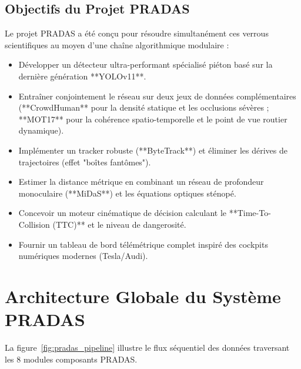 \documentclass[11pt,a4paper]{article}
\begin{document}
\subsection{Objectifs du Projet PRADAS}
Le projet PRADAS a été conçu pour résoudre simultanément ces verrous scientifiques au moyen d'une chaîne algorithmique modulaire :
\begin{itemize}
    \item Développer un détecteur ultra-performant spécialisé piéton basé sur la dernière génération **YOLOv11**.
    \item Entraîner conjointement le réseau sur deux jeux de données complémentaires (**CrowdHuman** pour la densité statique et les occlusions sévères ; **MOT17** pour la cohérence spatio-temporelle et le point de vue routier dynamique).
    \item Implémenter un tracker robuste (**ByteTrack**) et éliminer les dérives de trajectoires (effet "boîtes fantômes").
    \item Estimer la distance métrique en combinant un réseau de profondeur monoculaire (**MiDaS**) et les équations optiques sténopé.
    \item Concevoir un moteur cinématique de décision calculant le **Time-To-Collision (TTC)** et le niveau de dangerosité.
    \item Fournir un tableau de bord télémétrique complet inspiré des cockpits numériques modernes (Tesla/Audi).
\end{itemize}

\section{Architecture Globale du Système PRADAS}

La figure~\ref{fig:pradas_pipeline} illustre le flux séquentiel des données traversant les 8 modules composants PRADAS.
\end{document}
